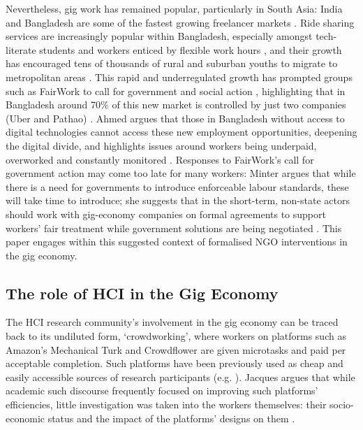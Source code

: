 Nevertheless, gig work has remained popular, particularly in South Asia: India and Bangladesh are some of the fastest growing freelancer markets \cite{Payoneer2019}. Ride sharing services are increasingly popular within Bangladesh, especially amongst tech-literate students and workers enticed by flexible work hours \cite{islam2019}, and their growth has encouraged tens of thousands of rural and suburban youths to migrate to metropolitan areas \cite{Fairwork2021}. This rapid and underregulated growth has prompted groups such as FairWork to call for government and social action \cite{Fairwork2021}, highlighting that in Bangladesh around 70\% of this new market is controlled by just two companies (Uber and Pathao) \cite{islam2019}. Ahmed argues that those in Bangladesh without access to digital technologies cannot access these new employment opportunities, deepening the digital divide, and highlights issues around workers being underpaid, overworked and constantly monitored \cite{Ahmed2020}. Responses to FairWork's call for government action may come too late for many workers: Minter argues that while there is a need for governments to introduce enforceable labour standards, these will take time to introduce; she suggests that in the short-term, non-state actors should work with gig-economy companies on formal agreements to support workers' fair treatment while government solutions are being negotiated \cite{Minter2017}. This paper engages within this suggested context of formalised NGO interventions in the gig economy.


\subsection{The role of HCI in the Gig Economy }

The HCI research community's involvement in the gig economy can be traced back to its undiluted form, `crowdworking', where workers on platforms such as Amazon's Mechanical Turk and Crowdflower are given microtasks and paid per acceptable completion. Such platforms have been previously used as cheap and easily accessible sources of research participants (e.g. \cite{mason2012conducting, mcnaney2016, Othman2017}). Jacques argues that while academic such discourse frequently focused on improving such platforms' efficiencies, little investigation was taken into the workers themselves: their socio-economic status and the impact of the platforms' designs on them \cite{Jacques2019}.

